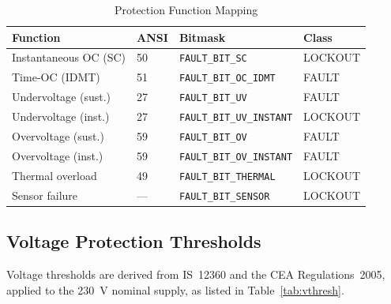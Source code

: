 \documentclass[conference]{IEEEtran}
\begin{document}
\begin{table}[t]
  \caption{Protection Function Mapping}
  \label{tab:ansi}
  \centering
  \renewcommand{\arraystretch}{1.15}
  \begin{tabular}{llll}
    \toprule
    \textbf{Function} & \textbf{ANSI} & \textbf{Bitmask} & \textbf{Class} \\
    \midrule
    Instantaneous OC (SC) & 50  & \texttt{FAULT\_BIT\_SC}          & LOCKOUT \\
    Time-OC (IDMT)        & 51  & \texttt{FAULT\_BIT\_OC\_IDMT}   & FAULT   \\
    Undervoltage (sust.)  & 27  & \texttt{FAULT\_BIT\_UV}          & FAULT   \\
    Undervoltage (inst.)  & 27  & \texttt{FAULT\_BIT\_UV\_INSTANT} & LOCKOUT \\
    Overvoltage (sust.)   & 59  & \texttt{FAULT\_BIT\_OV}          & FAULT   \\
    Overvoltage (inst.)   & 59  & \texttt{FAULT\_BIT\_OV\_INSTANT} & FAULT   \\
    Thermal overload      & 49  & \texttt{FAULT\_BIT\_THERMAL}     & LOCKOUT \\
    Sensor failure        & --- & \texttt{FAULT\_BIT\_SENSOR}      & LOCKOUT \\
    \bottomrule
  \end{tabular}
\end{table}

\subsection{Voltage Protection Thresholds}

Voltage thresholds are derived from IS~12360 and the CEA Regulations~2005,
applied to the \SI{230}{\volt} nominal supply, as listed in
Table~\ref{tab:vthresh}.
\end{document}
